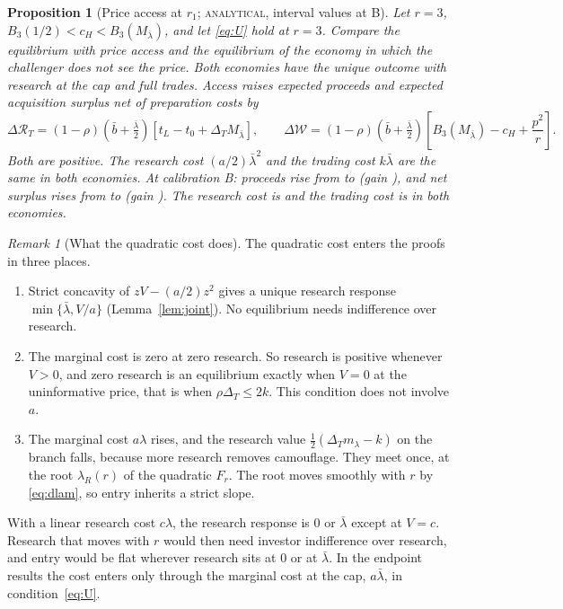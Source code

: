 \documentclass[12pt]{article}
\newtheorem{proposition}{Proposition}
\theoremstyle{definition}
\theoremstyle{remark}
\newtheorem{remark}{Remark}
\newcommand{\DT}{\Delta_T}
\newcommand{\lb}{\bar\lambda}
\newcommand{\st}[1]{\textsc{#1}}
\begin{document}
\begin{proposition}[Price access at $r_1$; \st{analytical}, interval values at B]\label{prop:access}
Let $r=3$, $B_3(1/2)<c_H<B_3(M_{\lb})$, and let \eqref{eq:U} hold at $r=3$. Compare the equilibrium with price
access and the equilibrium of the economy in which the challenger does not see the price. Both economies have the
unique outcome with research at the cap and full trades. Access raises expected proceeds and expected acquisition
surplus net of preparation costs by
\begin{equation}\label{eq:access}
\Delta\mathcal R_T=(1-\rho)\left(\bar b+\tfrac{\lb}2\right)\left[t_L-t_0+\DT M_{\lb}\right],\qquad
\Delta\mathcal W=(1-\rho)\left(\bar b+\tfrac{\lb}2\right)\left[B_3(M_{\lb})-c_H+\frac{p^2}{r}\right].
\end{equation}
Both are positive. The research cost $(a/2)\lb^2$ and the trading cost $k\lb$ are the same in both economies. At
calibration B: proceeds rise from  to  (gain ), and net
surplus rises from  to  (gain ). The research cost is
 and the trading cost is  in both economies.
\end{proposition}

\begin{remark}[What the quadratic cost does]\label{rem:cost}
The quadratic cost enters the proofs in three places.
\begin{enumerate}[nosep]
\item Strict concavity of $zV-(a/2)z^2$ gives a unique research response $\min\{\lb,V/a\}$
  (Lemma~\ref{lem:joint}). No equilibrium needs indifference over research.
\item The marginal cost is zero at zero research. So research is positive whenever $V>0$, and zero research is an
  equilibrium exactly when $V=0$ at the uninformative price, that is when $\rho\DT\le2k$. This condition does not
  involve $a$.
\item The marginal cost $a\lambda$ rises, and the research value $\frac12(\DT m_\lambda-k)$ on the branch falls,
  because more research removes camouflage. They meet once, at the root $\lambda_R(r)$ of the quadratic $F_r$. The
  root moves smoothly with $r$ by \eqref{eq:dlam}, so entry inherits a strict slope.
\end{enumerate}
With a linear research cost $c\lambda$, the research response is $0$ or $\lb$ except at $V=c$. Research that moves
with $r$ would then need investor indifference over research, and entry would be flat wherever research sits
at $0$ or at $\lb$. In the endpoint results the cost enters only through the marginal cost at the cap, $a\lb$, in
condition~\eqref{eq:U}.
\end{remark}
\end{document}
